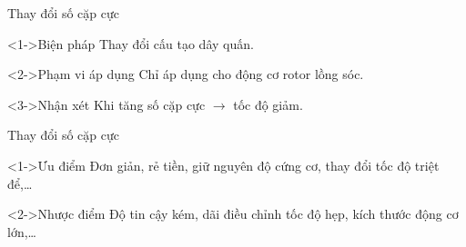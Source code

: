 \documentclass[20pt]{beamer}
\begin{document}
\begin{frame}{Thay đổi số cặp cực}
	\begin{block}<1->{Biện pháp}
		Thay đổi \textcolor{doden}{cấu tạo dây quấn}.
   \end{block}
   
   \begin{block}<2->{Phạm vi áp dụng}
		Chỉ áp dụng cho động cơ \textcolor{doden}{rotor lồng sóc}.
   \end{block}
   
   \begin{block}<3->{Nhận xét}
		Khi \textcolor{doden}{tăng số cặp cực} $\longrightarrow$ \textcolor{doden}{tốc độ giảm}.
   \end{block}
\end{frame}

\begin{frame}{Thay đổi số cặp cực}
	\begin{block}<1->{Ưu điểm}
		\justifying
		Đơn giản, rẻ tiền, giữ nguyên độ cứng cơ, thay đổi tốc độ triệt để,\ldots
   \end{block}
   
   \begin{block}<2->{Nhược điểm}
   		\justifying
		Độ tin cậy kém, dãi điều chỉnh tốc độ hẹp, kích thước động cơ lớn,\ldots
   \end{block}
\end{frame}

\end{document}
